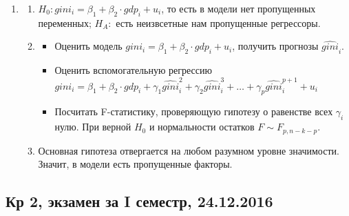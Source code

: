 \documentclass[12pt, a4paper]{article}\usepackage[]{graphicx}\usepackage[]{color}
\begin{document}
\begin{enumerate}
\item
\begin{enumerate}
\item $H_0: gini_i = \beta_1 + \beta_2 \cdot gdp_i + u_i$, то есть в модели нет пропущенных переменных; $H_A:$ есть неизвсетные нам пропущенные регрессоры.
\item
\begin{itemize}
\item Оценить модель $gini_i = \beta_1 + \beta_2 \cdot gdp_i + u_i$, получить прогнозы $\widehat{gini}_i$.
\item Оценить вспомогательную регрессию $gini_i = \beta_1 + \beta_2 \cdot gdp_i + \gamma_1 \widehat{gini}_i^2 + \gamma_2 \widehat{gini}_i^3 + \ldots + \gamma_p \widehat{gini}_i^{p+1} + u_i$
\item Посчитать F-статистику, проверяющую гипотезу о равенстве всех $\gamma_i$ нулю. При верной $H_0$ и нормальности остатков $F \sim F_{p, n-k-p}$.
\end{itemize}
\item Основная гипотеза отвергается на любом разумном уровне значимости. Значит, в модели есть пропущенные факторы.
\end{enumerate}
\end{enumerate}



\subsection{Кр 2, экзамен за I семестр, 24.12.2016}








\end{document}
